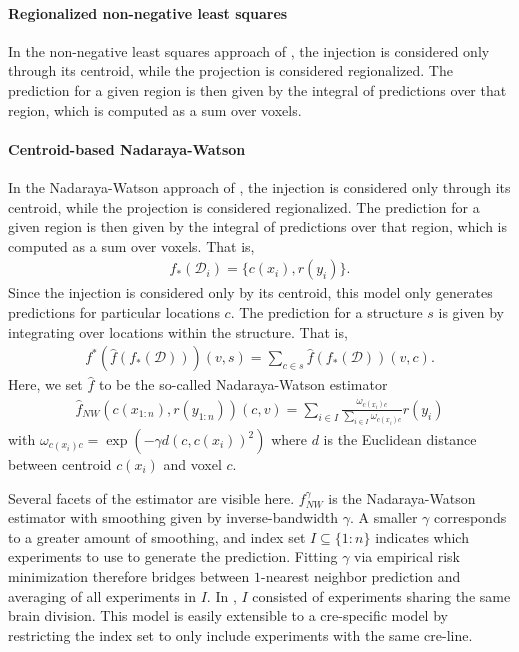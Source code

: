 \documentclass{article}
\begin{document}
\paragraph{Regionalized non-negative least squares}

In the non-negative least squares approach of \citet{Oh2014-kh}, the injection is considered only through its centroid, while the projection is considered regionalized.
The prediction for a given region is then given by the integral of predictions over that region, which is computed as a sum over voxels.

\paragraph{Centroid-based Nadaraya-Watson}

In the Nadaraya-Watson approach of \citet{Knox2019-ot}, the injection is considered only through its centroid, while the projection is considered regionalized.
The prediction for a given region is then given by the integral of predictions over that region, which is computed as a sum over voxels.
That is,
\begin{eqnarray*}
f_*({\mathcal D}_i) = \{c(x_i) , r(y_i)\}.
\end{eqnarray*}
Since the injection is considered only by its centroid, this model only generates predictions for particular locations $c$.  The prediction for a structure $s$ is given by integrating over locations within the structure.
That is,
\begin{eqnarray*}
\label{eq:regionalize}
f^* (\hat f (f_*(\mathcal D))) (v,s) = \sum_{c \in s} \hat f (f_*(\mathcal D)) (v,c).
\end{eqnarray*}
Here, we set $\hat f$ to be the so-called Nadaraya-Watson estimator
\begin{eqnarray*}
\hat f_{NW}( c(x_{1:n}) , r(y_{1:n}) ) (c,v) =  \sum_{i \in I} \frac{ \omega_{c(x_i) c}}{\sum_{i \in I} \omega_{c(x_i) c}} r(y_i)
\end{eqnarray*}
with $\omega_{c(x_i) c} = \exp( - \gamma d( c , c(x_i))^2 )$ where $d$ is the Euclidean distance between centroid $c(x_i)$ and voxel $c$.

Several facets of the estimator are visible here. $f_{NW}^{\gamma}$ is the Nadaraya-Watson estimator with smoothing given by inverse-bandwidth $\gamma$.
A smaller $\gamma$ corresponds to a greater amount of smoothing, and index set $I \subseteq  \{1:n\}$ indicates which experiments to use to generate the prediction.
Fitting $\gamma$ via empirical risk minimization therefore bridges between $1$-nearest neighbor prediction and averaging of all experiments in $I$.
In \citet{Knox2019-ot}, $I$ consisted of experiments sharing the same brain division.
This model is easily extensible to a cre-specific model by restricting the index set to only include experiments with the same cre-line.
\end{document}
